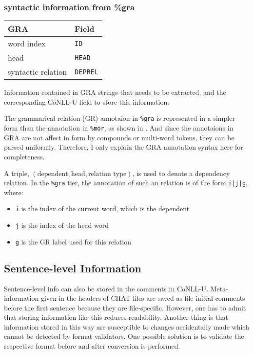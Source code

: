 \subsubsection{syntactic information from \%gra}

\begin{margintable}[1\baselineskip]
\begin{tabularx}{1\textwidth}{@{}ll@{}}
\toprule
\textbf{GRA} & \textbf{Field}\\\midrule
word index & \texttt{ID} \\
head & \texttt{HEAD}\\
syntactic relation & \texttt{DEPREL} \\\bottomrule
\end{tabularx}
\caption{\label{tab:martabgra}Information contained in GRA strings that needs to be extracted, and the corresponding CoNLL-U field to store this information.}
\footnotesize
\end{margintable}

The grammarical relation (GR) annotaion in \texttt{\%gra} is represented in a simpler form than the annotation in \texttt{\%mor}, as shown in . And since the annotaions in GRA are not affect in form by compounds or multi-word tokens, they can be parsed uniformly. Therefore, I only explain the GRA annotation syntax here for completeness.

A triple, $(\text{dependent}, \text{head}, \text{relation type})$, is used to denote a dependency relation. In the \texttt{\%gra} tier, the annotation of such an relation is of the form \texttt{i|j|g}, where:
\begin{itemize}
	\item \texttt{i} is the index of the current word, which is the dependent
	\item \texttt{j} is the index of the head word
	\item \texttt{g} is the GR label used for this relation
\end{itemize}


\subsection{Sentence-level Information}
Sentence-level info can also be stored in the comments in CoNLL-U. Meta-information given in the headers of CHAT files are saved as file-initial comments before the first sentence because they are file-specific.
However, one has to admit that storing information like this reduces readability. Another thing is that information stored in this way are susceptible to changes accidentally made which cannot be detected by format validators. One possible solution is to validate the respective format before and after conversion is performed.


